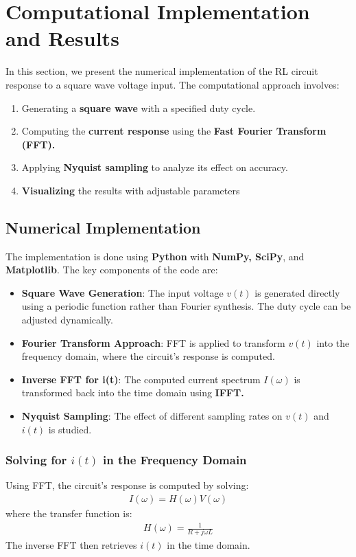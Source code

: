 \documentclass[journal]{IEEEtran}
\begin{document}
 \section{Computational Implementation and Results}
 In this section, we present the numerical implementation of the RL circuit response to a square wave voltage input. The computational approach involves:
 \begin{enumerate}
     \item Generating a \textbf{square wave} with a specified duty cycle.
     \item Computing the \textbf{current response} using the \textbf{Fast Fourier Transform (FFT).}
     \item Applying \textbf{Nyquist sampling} to analyze its effect on accuracy.
     \item \textbf{Visualizing} the results with adjustable parameters
 \end{enumerate}
 \subsection{Numerical Implementation}
 The implementation is done using \textbf{Python} with \textbf{NumPy, SciPy}, and \textbf{Matplotlib}. The key components of the code are:
 \begin{itemize}
     \item \textbf{Square Wave Generation}: The input voltage $v(t)$ is generated directly using a periodic function rather than Fourier synthesis. The duty cycle can be adjusted dynamically.
     \item \textbf{Fourier Transform Approach}: FFT is applied to transform $v(t)$ into the frequency domain, where the circuit's response is computed.
     \item \textbf{Inverse FFT for i(t)}: The computed current spectrum $I(\omega)$ is transformed back into the time domain using \textbf{IFFT.}
     \item \textbf{Nyquist Sampling}: The effect of different sampling rates on $v(t)$ and $i(t)$ is studied.
 \end{itemize}
 \subsubsection{Solving for $i(t)$ in the Frequency Domain}
Using FFT, the circuit's response is computed by solving:
\begin{align}
    I(\omega) = H(\omega) V(\omega)
\end{align}
where the transfer function is:
\begin{align}
    H(\omega) = \frac{1}{R + j\omega L}
\end{align}
The inverse FFT then retrieves $i(t)$ in the time domain.
\end{document}
